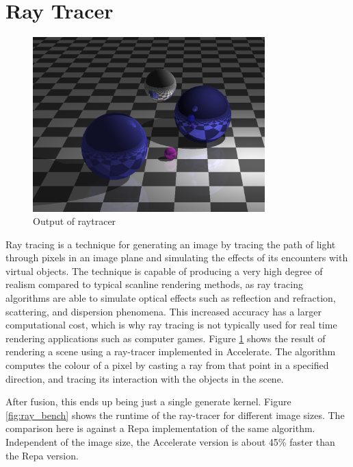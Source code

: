 \documentclass[a4paper,bibliography=totocnumbered,parskip,headsepline]{scrbook}
\begin{document}
\section{Ray Tracer}
\begin{figure}
    \centering
    \includegraphics[width=0.8\textwidth]{images/benchmarks/ray/ray_sample}
    \caption{Output of raytracer}
    \label{fig:ray_sample}
\end{figure}

Ray tracing is a technique for generating an image by tracing the path of light through pixels in an image plane and simulating the effects of its encounters with virtual objects.
The technique is capable of producing a very high degree of realism compared to typical scanline rendering methods, as ray tracing algorithms are able to simulate optical effects such as reflection and refraction, scattering, and dispersion phenomena.
This increased accuracy has a larger computational cost, which is why ray tracing is not typically used for real time rendering applications such as computer games.
Figure \ref{fig:ray_sample} shows the result of rendering a scene using a ray-tracer implemented in Accelerate.
The algorithm computes the colour of a pixel by casting a ray from that point in a specified direction, and tracing its interaction with the objects in the scene.

After fusion, this ends up being just a single generate kernel.
Figure \ref{fig:ray_bench} shows the runtime of the ray-tracer for different image sizes.
The comparison here is against a Repa implementation of the same algorithm.
Independent of the image size, the Accelerate version is about 45\% faster than the Repa version.
\end{document}
